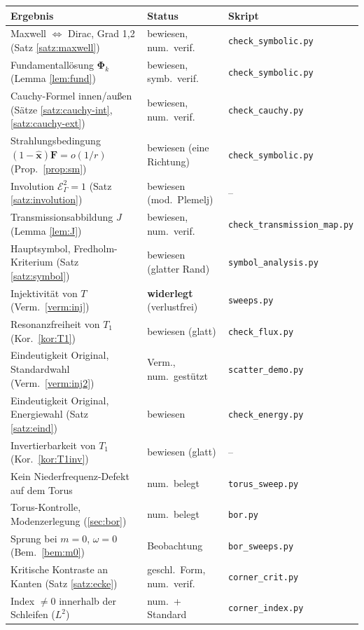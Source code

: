 \documentclass[11pt, a4paper]{article}
\newcommand{\mvec}[1]{\boldsymbol{#1}}
\newcommand{\xh}{\hat{\mvec{x}}}
\newcommand{\EG}{\mathcal{E}_\Gamma}
\theoremstyle{plain}
\theoremstyle{definition}
\begin{document}
\begin{center}
\footnotesize\setlength{\tabcolsep}{3pt}
\begin{tabular}{lll}
\toprule
Ergebnis & Status & Skript\\
\midrule
Maxwell $\Leftrightarrow$ Dirac, Grad 1,2 (Satz \ref{satz:maxwell}) & bewiesen, num.\ verif. & \texttt{check\_symbolic.py}\\
Fundamentallösung $\mvec{\Phi}_k$ (Lemma \ref{lem:fund}) & bewiesen, symb.\ verif. & \texttt{check\_symbolic.py}\\
Cauchy-Formel innen/außen (Sätze \ref{satz:cauchy-int}, \ref{satz:cauchy-ext}) & bewiesen, num.\ verif. & \texttt{check\_cauchy.py}\\
Strahlungsbedingung $(1-\xh)\mvec{F} = o(1/r)$ (Prop.\ \ref{prop:sm}) & bewiesen (eine Richtung) & \texttt{check\_symbolic.py}\\
Involution $\EG^2 = 1$ (Satz \ref{satz:involution}) & bewiesen (mod.\ Plemelj) & --\\
Transmissionsabbildung $J$ (Lemma \ref{lem:J}) & bewiesen, num.\ verif. & \texttt{check\_transmission\_map.py}\\
Hauptsymbol, Fredholm-Kriterium (Satz \ref{satz:symbol}) & bewiesen (glatter Rand) & \texttt{symbol\_analysis.py}\\
Injektivität von $T$ (Verm.\ \ref{verm:inj}) & \textbf{widerlegt} (verlustfrei) & \texttt{sweeps.py}\\
Resonanzfreiheit von $T_1$ (Kor.\ \ref{kor:T1}) & bewiesen (glatt) & \texttt{check\_flux.py}\\
Eindeutigkeit Original, Standardwahl (Verm.\ \ref{verm:inj2}) & Verm., num.\ gestützt & \texttt{scatter\_demo.py}\\
Eindeutigkeit Original, Energiewahl (Satz \ref{satz:eind}) & bewiesen & \texttt{check\_energy.py}\\
Invertierbarkeit von $T_1$ (Kor.\ \ref{kor:T1inv}) & bewiesen (glatt) & --\\
Kein Niederfrequenz-Defekt auf dem Torus & num.\ belegt & \texttt{torus\_sweep.py}\\
Torus-Kontrolle, Modenzerlegung (\ref{sec:bor}) & num.\ belegt & \texttt{bor.py}\\
Sprung bei $m=0$, $\omega=0$ (Bem.\ \ref{bem:m0}) & Beobachtung & \texttt{bor\_sweeps.py}\\
Kritische Kontraste an Kanten (Satz \ref{satz:ecke}) & geschl.\ Form, num.\ verif. & \texttt{corner\_crit.py}\\
Index $\neq0$ innerhalb der Schleifen ($L^2$) & num.\ + Standard & \texttt{corner\_index.py}\\

\end{tabular}
\end{center}
\end{document}
